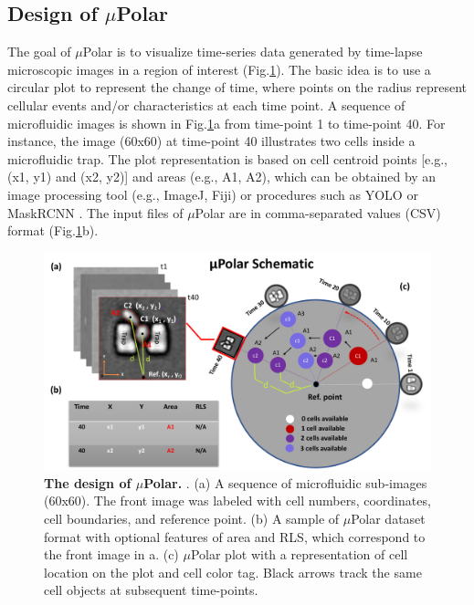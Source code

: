 \documentclass[conference]{IEEEtran}
\begin{document}
\subsection{Design of $\mu$Polar} 
The goal of $\mu$Polar  is to visualize time-series data generated by time-lapse microscopic images in a region of interest (Fig.\ref{fig:table}). The basic idea is to use a circular plot to represent the change of time, where points on the radius represent cellular events and/or characteristics at each time point. 
A sequence of microfluidic images is shown in Fig.\ref{fig:table}a from time-point 1 to time-point 40. For instance, the image (60x60) at time-point 40 illustrates two cells inside a microfluidic trap. The plot representation is based on cell centroid points [e.g., (x1, y1) and (x2, y2)] and areas (e.g., A1, A2), which can be obtained by an image processing tool (e.g., ImageJ, Fiji) or procedures such as YOLO or MaskRCNN \cite{r21,r22,r23,r24}. The input files of $\mu$Polar are in comma-separated values (CSV) format (Fig.\ref{fig:table}b).   

\begin{figure}
\centering
\includegraphics[width=\textwidth,height=10 cm]{Patterns/polar.pdf}
\caption{ \textbf{The design of $\mu$Polar. }. 
(a) A sequence of microfluidic sub-images (60x60). The front image was labeled with cell numbers, coordinates, cell boundaries, and reference point. 
(b) A sample of $\mu$Polar dataset format with optional features of area and RLS, which correspond to the front image in a. (c) $\mu$Polar plot with a representation of cell location on the plot and cell color tag. Black arrows track the same cell objects at subsequent time-points.
}
\label{fig:table}
\end{figure}
\end{document}
